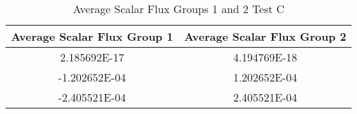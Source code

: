 \begin{longtable}{|c|c|}
\caption{Average Scalar Flux Groups 1 and 2 Test  C}
\label{tlabel} \\
\hline
\rowcolor[gray]{0.85}\textbf{Average Scalar Flux Group 1} &\textbf{Average Scalar Flux Group 2}  \\  
\hline
2.185692E-17    &   4.194769E-18       \\ \hline
-1.202652E-04   &   1.202652E-04 \\ \hline
-2.405521E-04   &   2.405521E-04 \\ \hline
\end{longtable}
